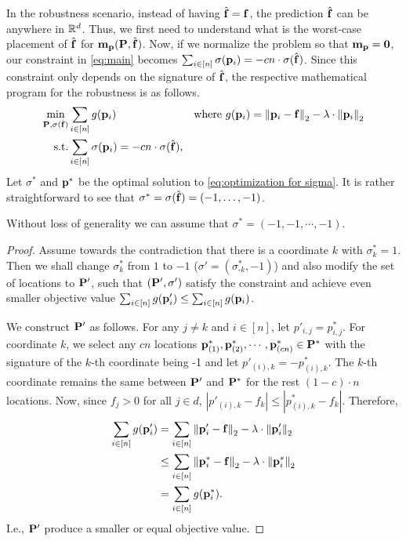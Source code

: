 In the robustness scenario, instead of having $\pred=\facility$, the prediction $\pred$ can be anywhere in $\reals^d$. Thus, we first need to understand what is the worst-case placement of $\pred$ for $\cmp(\locs,\pred)$. Now, if we normalize the problem so that $\cmp=\vect{0}$, our constraint in \eqref{eq:main} becomes $\sum_{i\in[n]}\sigma(\loc_i)=-cn\cdot\sigma(\pred)$. Since this constraint only depends on the signature of $\pred$, the respective mathematical program for the robustness is as follows.
\begin{align}
 \label{eq:optimization for sigma}
 \min\limits_{\locs,\sigma(\pred)}&\sum_{i\in[n]} g(\loci) &\text{where }g(\loci)=\qnorm[2]{\loci-\facility}-\lambda\cdot\qnorm[2]{\loci} \nonumber\\
 \text{s.t.}&  \sum_{i\in [n]}\sigma(\loci) = -cn\cdot\sigma(\pred),& 
\end{align}
Let $\sigma^*$ and $\loc^*$ be the optimal solution to \eqref{eq:optimization for sigma}. It is rather straightforward to see that $\sigma^*=\sigma(\pred)=(-1,\ldots,-1)$.
\begin{lemma} 
    \label{lm:optimal solution for sigma(pred)}
    Without loss of generality we can assume that 
    $\sigma^*=(-1,-1,\cdots,-1)$.
\end{lemma}
\begin{proof} Assume towards the contradiction that there is a coordinate $k$ with $\sigma^*_k=1$. Then we shall change $\sigma^*_k$ from $1$ to $-1$ ($\sigma'=(\sigma^*_{\text{-}k},-1)$) and also modify the set of locations to $\locs'$, such that $(\locs',\sigma')$ satisfy the constraint and achieve even smaller objective value $\sum_{i\in[n]}g(\loci')\le\sum_{i\in[n]}g(\loci)$. 

We construct $\locs'$ as follows. For any $j\neq k$ and $i\in[n]$, let $p'_{i,j}=p^*_{i,j}$. For coordinate $k$, we select any $cn$ locations $\loc^*_{(1)},\loc^*_{(2)},\cdots,\loc^*_{(cn)} \in \locs^*$ with the signature of the $k$-th coordinate being -1 and let $p'_{(i),k}=-p^*_{(i),k}$. The $k$-th coordinate remains the same between $\locs'$ and $\locs^*$ for the rest $(1-c)\cdot n$ locations. Now, since $f_j>0$ for all $j\in d$, $|p'_{(i),k}-f_k|\leq|p^*_{(i),k}-f_k|$. Therefore, 
    \begin{align*}
        \sum_{i\in[n]} g(\loci')&=\sum_{i\in[n]}\qnorm[2]{\loci'-\facility}-\lambda\cdot\qnorm[2]{\loci'}\\
        &\leq \sum_{i\in[n]}\qnorm[2]{\loci^*-\facility}-\lambda\cdot\qnorm[2]{\loci^*}\\
        &=\sum_{i\in[n]} g(\loci^*).
    \end{align*}
     I.e., $\locs'$ produce a smaller or equal objective value.
\end{proof}

